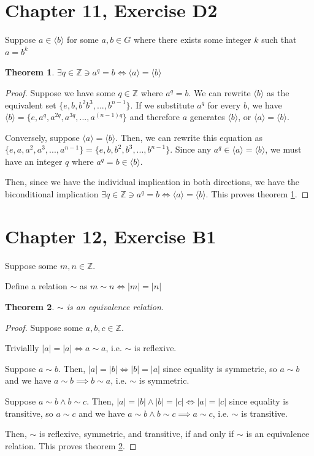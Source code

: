 \documentclass[12pt]{amsart}
\newcommand{\ints}{\mathbb{Z}}
\newtheorem{thm}{Theorem}
\begin{document}
\section{Chapter 11, Exercise D2}

Suppose $a \in \langle b \rangle$ for some $a,b \in G$
where there exists some integer $k$ such that $a = b^k$

\begin{thm} \label{thm12}
	$\exists q \in \ints \ni a^q = b \iff \langle a \rangle = \langle b \rangle$
\end{thm}

\begin{proof}
	Suppose we have some $q \in \ints$
	where $a^q = b$.
	We can rewrite $\langle b \rangle$
	as the equivalent set $\{ e, b, b^2 b^3, ..., b^{n-1} \}$.
	If we substitute $a^q$ for every $b$,
	we have $\langle b \rangle = \{e, a^q, a^{2q}, a^{3q}, ..., a^{(n-1)q} \}$
	and therefore $a$ generates $\langle b \rangle$,
	or $\langle a \rangle = \langle b \rangle$.

	Conversely, suppose $\langle a \rangle = \langle b \rangle$.
	Then, we can rewrite this equation as
	$\{e, a, a^2, a^3, ..., a^{n-1} \} = \{e, b, b^2, b^3, ..., b^{n-1} \}$.
	Since any $a^q \in \langle a \rangle = \langle b \rangle$,
	we must have an integer $q$ where $a^q = b \in \langle b \rangle$.

	Then, since we have the individual implication in both directions,
	we have the biconditional implication
	$\exists q \in \ints \ni a^q = b \iff \langle a \rangle = \langle b \rangle$.
	This proves theorem \ref{thm12}.
\end{proof}

\section{Chapter 12, Exercise B1}

Suppose some $m,n \in \ints$.

Define a relation $\sim$ as $m \sim n \iff |m| = |n|$

\begin{thm} \label{thm9}
	$\sim$ is an equivalence relation.
\end{thm}

\begin{proof}
	Suppose some $a,b,c \in \ints$.

	Triviallly $|a| = |a| \iff a \sim a$,
	i.e. $\sim$ is reflexive.

	Suppose $a \sim b$.
	Then, $|a| = |b| \iff |b| = |a|$
	since equality is symmetric,
	so $a \sim b$
	and we have $a \sim b \implies b \sim a$,
	i.e. $\sim$ is symmetric.

	Suppose $a \sim b \land b \sim c$.
	Then, $|a| = |b| \land |b| = |c| \iff |a| = |c|$
	since equality is transitive,
	so $a \sim c$
	and we have $a \sim b \land b \sim c \implies a \sim c$,
	i.e. $\sim$ is transitive.

	Then,
	$\sim$ is
	reflexive,
	symmetric,
	and transitive,
	if and only if
	$\sim$ is an equivalence relation.
	This proves theorem \ref{thm9}.
\end{proof}
\end{document}
